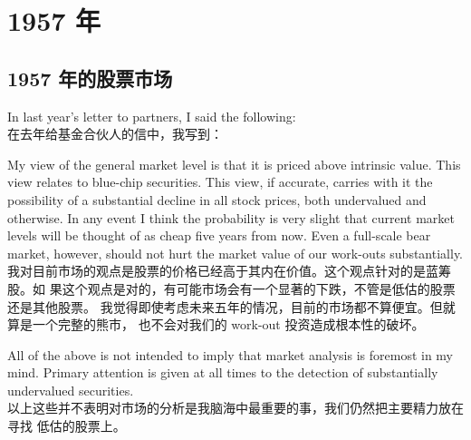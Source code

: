 \chapter{1957 年}

\section{1957 年的股票市场}

\begin{verseparallel}
  {
    \noindent In last year's letter to partners, I said the following: \\
  }
  {
    在去年给基金合伙人的信中，我写到：
  }
\end{verseparallel}

\begin{verseparallel}
  {
    My view of the general market level is that it is priced above intrinsic
    value. This view relates to blue-chip securities. This view, if accurate,
    carries with it the possibility of a substantial decline in all stock
    prices, both undervalued and otherwise. In any event I think the probability
    is very slight that current market levels will be thought of as cheap five
    years from now. Even a full-scale bear market, however, should not hurt the
    market value of our work-outs substantially. \\
  }
  {
    我对目前市场的观点是股票的价格已经高于其内在价值。这个观点针对的是蓝筹股。如
    果这个观点是对的，有可能市场会有一个显著的下跌，不管是低估的股票还是其他股票。
    我觉得即使考虑未来五年的情况，目前的市场都不算便宜。但就算是一个完整的熊市，
    也不会对我们的 work-out 投资造成根本性的破坏。
  }
\end{verseparallel}

\begin{verseparallel}
  {
    All of the above is not intended to imply that market analysis is foremost
    in my mind. Primary attention is given at all times to the detection of
    substantially undervalued securities. \\
  }
  {
    以上这些并不表明对市场的分析是我脑海中最重要的事，我们仍然把主要精力放在寻找
    低估的股票上。
  }
\end{verseparallel}

